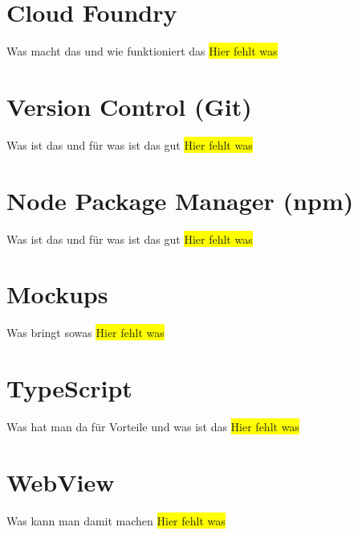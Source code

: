 \section{Cloud Foundry}
Was macht das und wie funktioniert das
\colorbox{yellow}{Hier fehlt was}

\section{Version Control (Git)}
Was ist das und für was ist das gut
\colorbox{yellow}{Hier fehlt was}

\section{Node Package Manager (npm)}
Was ist das und für was ist das gut
\colorbox{yellow}{Hier fehlt was}

\section{Mockups}
Was bringt sowas
\colorbox{yellow}{Hier fehlt was}

\section{TypeScript}
Was hat man da für Vorteile und was ist das
\colorbox{yellow}{Hier fehlt was}

\section{WebView}
Was kann man damit machen
\colorbox{yellow}{Hier fehlt was}
